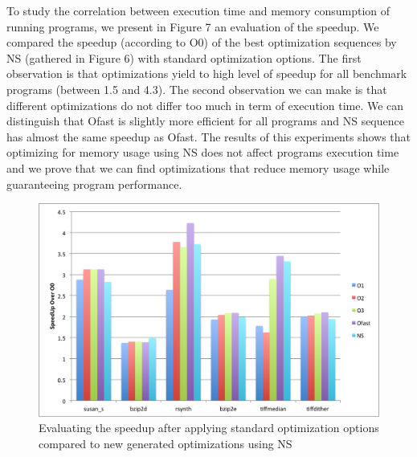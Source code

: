 To study the correlation between execution time and memory consumption of running programs, we present in Figure 7 an evaluation of the speedup. We compared the speedup (according to O0) of the best optimization sequences by NS (gathered in Figure 6) with standard optimization options. 
The first observation is that optimizations yield to high level of speedup for all benchmark programs (between 1.5 and 4.3).
The second observation we can make is that different optimizations do not differ too much in term of execution time. We can distinguish that Ofast is slightly more efficient for all programs and NS sequence has almost the same speedup as Ofast. 
The results of this experiments shows that optimizing for memory usage using NS does not affect programs execution time and we prove that we can find optimizations that reduce memory usage while guaranteeing program performance.
\begin{figure}[!ht]
	\centering
	\includegraphics[width=1.\linewidth]{Ressources/infra_novelty_stat2.png}
	\caption{Evaluating the speedup after applying standard optimization options compared to new generated optimizations using NS}
\end{figure}


